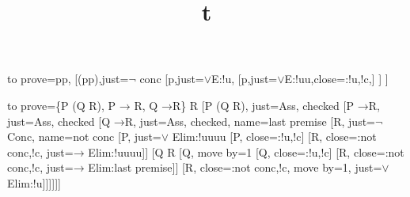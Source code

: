 \documentclass{article}
\title{t}
\newcommand*{\lif}{\ensuremath{\mathbin{\rightarrow}}}
\begin{document}
\begin{ttableau}{%
  to prove=\sststile{}{}p\vee\lnot p,
}
  [\lnot(p\vee\lnot p),just=$\lnot$ conc
    [\lnot p,just=$\vee$E:!u,
      [\lnot\lnot p,just=$\vee$E:!uu,close={:!u,!c},]
    ]
  ]
\end{ttableau}
\begin{ttableau}
  {
    to prove={\{P \vee (Q \vee \lnot R), P \lif
      \lnot R, Q \lif \lnot R\} \sststile{}{} \lnot
    R}
  }
  [P \vee (Q \vee \lnot R), just=Ass, checked
    [P \lif \lnot R, just=Ass, checked
      [Q \lif \lnot R, just=Ass, checked, name=last premise
        [\lnot\lnot R, just={$\lnot$ Conc},
          name=not conc
          [P, just={$\vee$ Elim:!uuuu}
            [\lnot P, close={:!u,!c}]
            [\lnot R, close={:not conc,!c},
          just={$\lif$ Elim:!uuuu}]]
          [Q \vee \lnot R
            [Q, move by=1
              [\lnot Q, close={:!u,!c}]
              [\lnot R, close={:not conc,!c},
            just={$\lif$ Elim:last premise}]]
            [\lnot R, close={:not conc,!c},
  move by=1, just={$\vee$ Elim:!u}]]]]]]
\end{ttableau}
\end{document}
